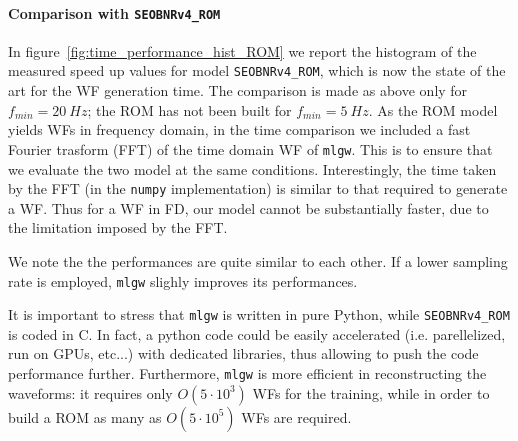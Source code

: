 \paragraph{Comparison with \texttt{SEOBNRv4\_ROM}}
In figure~\ref{fig:time_performance_hist_ROM} we report the histogram of the measured speed up values for model \texttt{SEOBNRv4\_ROM}, which is now the state of the art for the WF generation time.
The comparison is made as above only for $f_{min} = \SI{20}{Hz}$; the ROM has not been built for $f_{min} = \SI{5}{Hz}$.
As the ROM model yields WFs in frequency domain, in the time comparison we included a fast Fourier trasform (FFT) of the time domain WF of \texttt{mlgw}. This is to ensure that we evaluate the two model at the same conditions.
Interestingly, the time taken by the FFT (in the \texttt{numpy}
implementation) is similar to that required to generate a WF. Thus for
a WF in FD, our model cannot be substantially faster, due to the
limitation imposed by the FFT.
\par
We note the the performances are quite similar to each other.
If a lower sampling rate is employed, \texttt{mlgw} slighly improves its performances.
\par
It is important to stress that \texttt{mlgw} is written in pure
Python, while \texttt{SEOBNRv4\_ROM} is coded in C.
In fact, a python code could be easily accelerated (i.e. parellelized, run on GPUs, etc...) with dedicated libraries, thus allowing to push the code performance further.
%
%
Furthermore, \texttt{mlgw} is more efficient in reconstructing the
waveforms: it requires only $O(5\cdot 10^3)$ WFs for the training,
while in order to build a ROM as many as $O(5\cdot 10^5)$ WFs are
required. 
\par
